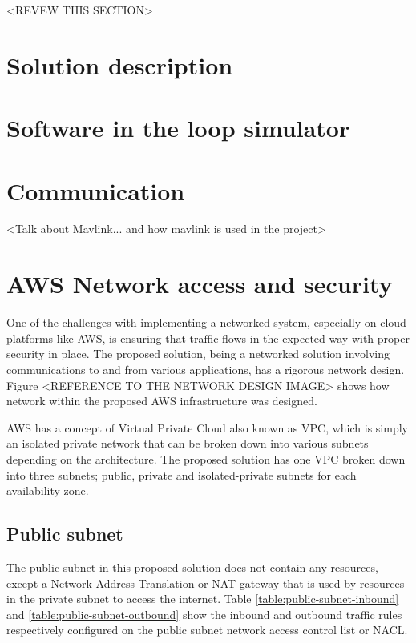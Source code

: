 <REVEW THIS SECTION>

\section{Solution description}


\section{Software in the loop simulator}
\label{sec:software-in-the-loop}


\section{Communication}
<Talk about Mavlink... and how mavlink is used in the project>

\section{AWS Network access and security}
One of the challenges with implementing a networked system, especially on cloud platforms like AWS, is ensuring that traffic flows in the expected way with proper security in place. The proposed solution, being a networked solution involving communications to and from various applications, has a rigorous network design. Figure <REFERENCE TO THE NETWORK DESIGN IMAGE> shows how network within the proposed AWS infrastructure was designed.

AWS has a concept of Virtual Private Cloud also known as VPC, which is simply an isolated private network that can be broken down into various subnets depending on the architecture. The proposed solution has one VPC broken down into three subnets; public, private and isolated-private subnets for each availability zone.

\subsection{Public subnet}
\label{public-subnet}
The public subnet in this proposed solution does not contain any resources, except a Network Address Translation or NAT gateway that is used by resources in the private subnet to access the internet. Table \ref{table:public-subnet-inbound} and \ref{table:public-subnet-outbound} show the inbound and outbound traffic rules respectively configured on the public subnet network access control list or NACL.


